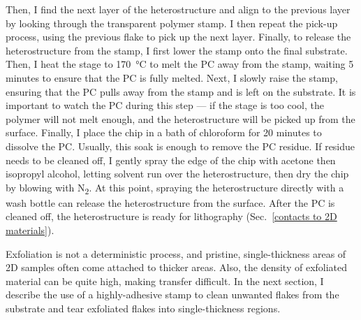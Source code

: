 \documentclass[double,12pt,1in,seploa]{beavtex}
\begin{document}
Then, I find the next layer of the heterostructure and align to the previous layer by looking through the transparent polymer stamp. I then repeat the pick-up process, using the previous flake to pick up the next layer. Finally, to release the heterostructure from the stamp, I first lower the stamp onto the final substrate. Then, I heat the stage to \SI{170}{\celsius} to melt the PC away from the stamp, waiting 5 minutes to ensure that the PC is fully melted. Next, I slowly raise the stamp, ensuring that the PC pulls away from the stamp and is left on the substrate. It is important to watch the PC during this step — if the stage is too cool, the polymer will not melt enough, and the heterostructure will be picked up from the surface. Finally, I place the chip in a bath of chloroform for 20 minutes to dissolve the PC. Usually, this soak is enough to remove the PC residue. If residue needs to be cleaned off, I gently spray the edge of the chip with acetone then isopropyl alcohol, letting solvent run over the heterostructure, then dry the chip by blowing with N\textsubscript{2}. At this point, spraying the heterostructure directly with a wash bottle can release the heterostructure from the surface. After the PC is cleaned off, the heterostructure is ready for lithography (Sec.\ \ref{contacts to 2D materials}).

Exfoliation is not a deterministic process, and pristine, single-thickness areas of 2D samples often come attached to thicker areas. Also, the density of exfoliated material can be quite high, making transfer difficult. In the next section, I describe the use of a highly-adhesive stamp to clean unwanted flakes from the substrate and tear exfoliated flakes into single-thickness regions.





\begin{center}

    \linespread{1.0}\selectfont

\end{center}
\end{document}
